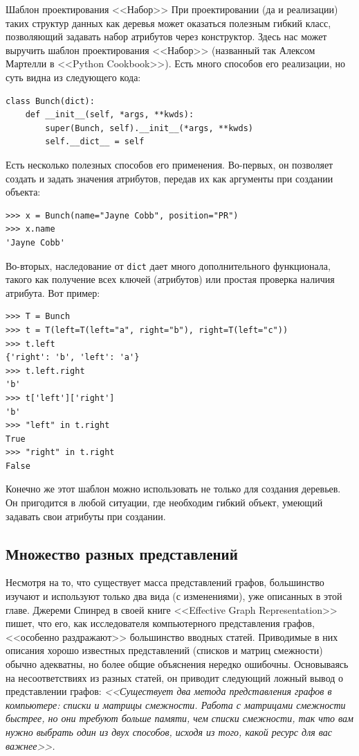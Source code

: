\begin{notice}{Шаблон проектирования <<Набор>>}
При проектировании (да и реализации) таких структур данных как деревья может оказаться полезным гибкий класс, позволяющий задавать набор атрибутов через конструктор. Здесь нас может выручить шаблон проектирования <<Набор>> (названный так Алексом Мартелли в <<Python Cookbook>>). Есть много способов его реализации, но суть видна из следующего кода:
\begin{lstlisting}
class Bunch(dict):
	def __init__(self, *args, **kwds):
		super(Bunch, self).__init__(*args, **kwds)
		self.__dict__ = self
\end{lstlisting}

Есть несколько полезных способов его применения. Во-первых, он позволяет создать и задать значения атрибутов, передав их как аргументы при создании объекта:
\begin{lstlisting}
>>> x = Bunch(name="Jayne Cobb", position="PR")
>>> x.name
'Jayne Cobb'
\end{lstlisting}

Во-вторых, наследование от \texttt{dict} дает много дополнительного функционала, такого как получение всех ключей (атрибутов) или простая проверка наличия атрибута. Вот пример:
\begin{lstlisting}
>>> T = Bunch
>>> t = T(left=T(left="a", right="b"), right=T(left="c"))
>>> t.left
{'right': 'b', 'left': 'a'}
>>> t.left.right
'b'
>>> t['left']['right']
'b'
>>> "left" in t.right
True
>>> "right" in t.right
False
\end{lstlisting}

Конечно же этот шаблон можно использовать не только для создания деревьев. Он пригодится в любой ситуации, где необходим гибкий объект, умеющий задавать свои атрибуты при создании.
\end{notice}

\subsection{Множество разных представлений}

Несмотря на то, что существует масса представлений графов, большинство изучают и используют только два вида (с изменениями), уже описанных в этой главе. Джереми Спинред в своей книге <<Effective Graph Representation>> пишет, что его, как исследователя компьютерного представления графов, <<особенно раздражают>> большинство вводных статей. Приводимые в них описания хорошо известных представлений (списков и матриц смежности) обычно адекватны, но более общие объяснения нередко ошибочны. Основываясь на несоответствиях из разных статей, он приводит следующий ложный вывод о представлении графов:
\textit{<<Существует два метода представления графов в компьютере: списки и матрицы смежности. Работа с матрицами смежности быстрее, но они требуют больше памяти, чем списки смежности, так что вам нужно выбрать один из двух способов, исходя из того, какой ресурс для вас важнее>>.}

